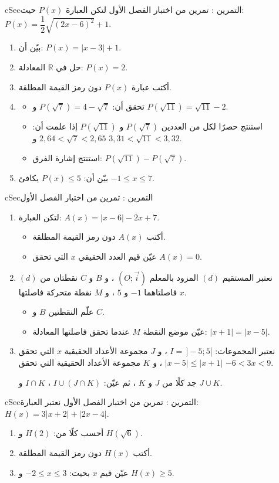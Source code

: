 \documentclass[12pt,a4paper]{article}
\newenvironment{BOX}[2]{\begin{otherlanguage}{english}\begin{arbox}{#1}{#2}}{\end{arbox}\end{otherlanguage}}
\newcounter{exo}
\newenvironment{tamrin}[1]{\stepcounter{exo}\begin{BOX}{cSec}{التمرين \theexo: #1}}{\end{BOX}}
\newcommand{\R}{\mathbb{R}}
\newenvironment{sq}{\begin{itemize}[leftmargin=2.4em,itemsep=3pt]}{\end{itemize}}
\newcommand{\qa}{\item[(أ)]}\newcommand{\qb}{\item[(ب)]}\newcommand{\qc}{\item[(جـ)]}\newcommand{\qd}{\item[(د)]}\newcommand{\qe}{\item[(هـ)]}
\begin{document}
\begin{tamrin}{تمرين من اختبار الفصل الأول}
لتكن العبارة $P(x)$ حيث: $P(x)=\dfrac12\sqrt{(2x-6)^2}+1$.
\begin{enumerate}
\item بيّن أن: $P(x)=|x-3|+1$.
\item حل في $\R$ المعادلة: $P(x)=2$.
\item أكتب عبارة $P(x)$ دون رمز القيمة المطلقة.
\item
\begin{sq}
\qa تحقق أن: $P\left(\sqrt7\right)=4-\sqrt7$ و $P\left(\sqrt{11}\right)=\sqrt{11}-2$.
\qb استنتج حصرًا لكل من العددين $P\left(\sqrt7\right)$ و $P\left(\sqrt{11}\right)$ إذا علمت أن: $2{,}64<\sqrt7<2{,}65$ و $3{,}31<\sqrt{11}<3{,}32$.
\qc استنتج إشارة الفرق: $P\left(\sqrt{11}\right)-P\left(\sqrt7\right)$.
\end{sq}
\item بيّن أن: $P(x)\leqslant5$ يكافئ $-1\leqslant x\leqslant7$.
\end{enumerate}
\end{tamrin}

\begin{tamrin}{تمرين من اختبار الفصل الأول}
\begin{enumerate}
\item لتكن العبارة: $A(x)=|x-6|-2x+7$.
\begin{sq}
\qa أكتب $A(x)$ دون رمز القيمة المطلقة.
\qb عيّن قيم العدد الحقيقي $x$ التي تحقق $A(x)=0$.
\end{sq}
\item نعتبر المستقيم $(d)$ المزود بالمعلم $(O;\vec i)$ ، و $B$ و $C$ نقطتان من $(d)$ فاصلتاهما $-1$ و $5$ ، و $M$ نقطة متحركة فاصلتها $x$.
\begin{sq}
\qa علّم النقطتين $B$ و $C$.
\qb عيّن موضع النقطة $M$ عندما تحقق فاصلتها المعادلة: $|x+1|=|x-5|$.
\end{sq}
\item نعتبر المجموعات: $I=\,]-5;5[$ ، و $J$ مجموعة الأعداد الحقيقية $x$ التي تحقق $|x-5|\leqslant|x+1|$ ، و $K$ مجموعة الأعداد الحقيقية التي تحقق $-6<3x<9$.\par
جد كلًا من $J$ و $K$ ، ثم عيّن: $I\cup(J\cap K)$ ، $I\cap K$ و $J\cup K$.
\end{enumerate}
\end{tamrin}

\begin{tamrin}{تمرين من اختبار الفصل الأول}
نعتبر العبارة: $H(x)=3|x+2|+|2x-4|$.
\begin{enumerate}
\item أحسب كلًا من: $H(2)$ و $H\left(\sqrt6\right)$.
\item أكتب $H(x)$ دون رمز القيمة المطلقة.
\item عيّن قيم $x$ بحيث: $-2\leqslant x\leqslant3$ و $H(x)\geqslant5$.
\end{enumerate}
\end{tamrin}
\end{document}
